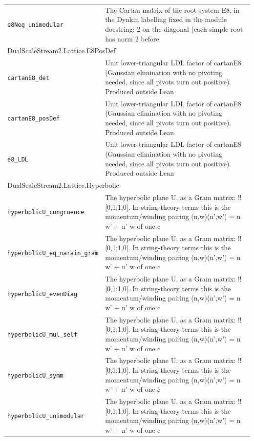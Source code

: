 \begin{longtable}{p{}p{}}
\quad\texttt{\footnotesize e8Neg\_unimodular} & {\footnotesize The Cartan matrix of the root system E8, in the Dynkin labelling fixed in the module docstring: 2 on the diagonal (each simple root has norm 2 before } \\
\multicolumn{2}{l}{\textsf{\small DualScaleStream2.Lattice.E8PosDef}} \\
\quad\texttt{\footnotesize cartanE8\_det} & {\footnotesize Unit lower-triangular LDL factor of cartanE8 (Gaussian elimination with no pivoting needed, since all pivots turn out positive). Produced outside Lean} \\
\quad\texttt{\footnotesize cartanE8\_posDef} & {\footnotesize Unit lower-triangular LDL factor of cartanE8 (Gaussian elimination with no pivoting needed, since all pivots turn out positive). Produced outside Lean} \\
\quad\texttt{\footnotesize e8\_LDL} & {\footnotesize Unit lower-triangular LDL factor of cartanE8 (Gaussian elimination with no pivoting needed, since all pivots turn out positive). Produced outside Lean} \\
\multicolumn{2}{l}{\textsf{\small DualScaleStream2.Lattice.Hyperbolic}} \\
\quad\texttt{\footnotesize hyperbolicU\_congruence} & {\footnotesize The hyperbolic plane U, as a Gram matrix: !![0,1;1,0]. In string-theory terms this is the momentum/winding pairing (n,w)(n',w') = n w' + n' w of one c} \\
\quad\texttt{\footnotesize hyperbolicU\_eq\_narain\_gram} & {\footnotesize The hyperbolic plane U, as a Gram matrix: !![0,1;1,0]. In string-theory terms this is the momentum/winding pairing (n,w)(n',w') = n w' + n' w of one c} \\
\quad\texttt{\footnotesize hyperbolicU\_evenDiag} & {\footnotesize The hyperbolic plane U, as a Gram matrix: !![0,1;1,0]. In string-theory terms this is the momentum/winding pairing (n,w)(n',w') = n w' + n' w of one c} \\
\quad\texttt{\footnotesize hyperbolicU\_mul\_self} & {\footnotesize The hyperbolic plane U, as a Gram matrix: !![0,1;1,0]. In string-theory terms this is the momentum/winding pairing (n,w)(n',w') = n w' + n' w of one c} \\
\quad\texttt{\footnotesize hyperbolicU\_symm} & {\footnotesize The hyperbolic plane U, as a Gram matrix: !![0,1;1,0]. In string-theory terms this is the momentum/winding pairing (n,w)(n',w') = n w' + n' w of one c} \\
\quad\texttt{\footnotesize hyperbolicU\_unimodular} & {\footnotesize The hyperbolic plane U, as a Gram matrix: !![0,1;1,0]. In string-theory terms this is the momentum/winding pairing (n,w)(n',w') = n w' + n' w of one c} \\

\end{longtable}
